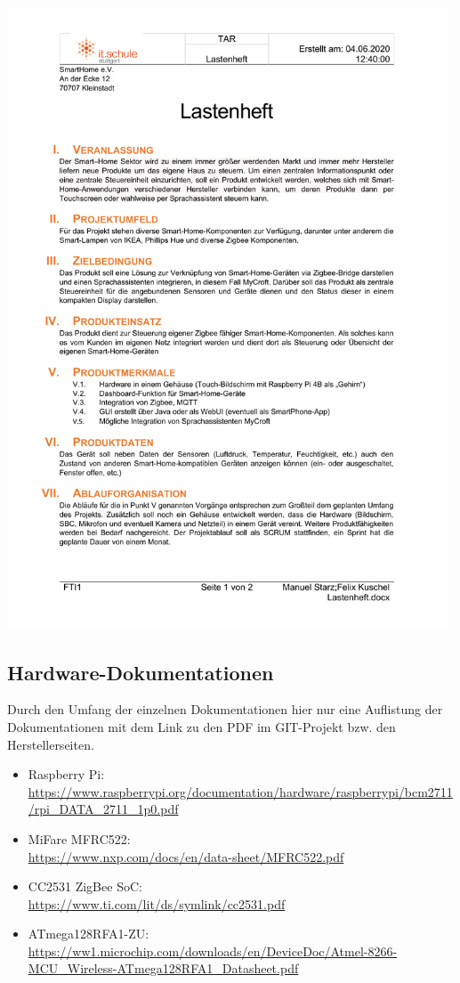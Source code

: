 \documentclass[12pt,a4paper]{article}
\begin{document}
 	\includegraphics[width=0.98\textwidth, page=2]{lastenheft.pdf}
 	\newpage
 	\subsection{Hardware-Dokumentationen}
 	Durch den Umfang der einzelnen Dokumentationen hier nur eine Auflistung der Dokumentationen mit dem Link zu den PDF im GIT-Projekt bzw. den Herstellerseiten.
 	\begin{itemize}
 		\item Raspberry Pi:\\ {\url{https://www.raspberrypi.org/documentation/hardware/raspberrypi/bcm2711/rpi_DATA_2711_1p0.pdf}}
 		\item MiFare MFRC522:\\ {\url{https://www.nxp.com/docs/en/data-sheet/MFRC522.pdf}}
 		\item CC2531 ZigBee SoC:\\ {\url{https://www.ti.com/lit/ds/symlink/cc2531.pdf}}
 		\item ATmega128RFA1-ZU:\\ {\url{https://ww1.microchip.com/downloads/en/DeviceDoc/Atmel-8266-MCU_Wireless-ATmega128RFA1_Datasheet.pdf}}
 	\end{itemize}
 	\newpage
 	\listoffigures
\end{document}
